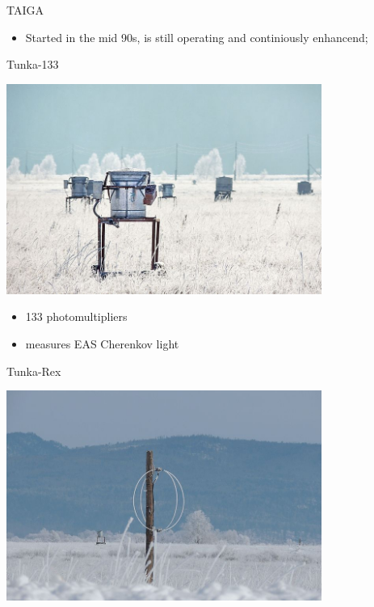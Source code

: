 \begin{frame}{TAIGA}
\footnotesize
\vspace{-1em}
\begin{itemize}
 \item Started in the mid 90s, is still operating and continiously enhancend;
\end{itemize}
\vspace{-2em}
\begin{minipage}[t]{0.31\textwidth}
  \begin{block}{\small Tunka-133}
    \parbox[c][0.20\textheight][t]{1\textwidth}{
      \centering
      \includegraphics[width=0.7742\textwidth]{pics/Tunka-133.jpg}
    }
    \hfill
    \parbox[c][0.15\textheight][t]{1\textwidth}{
      \begin{itemize}
        \setlength{\itemsep}{0pt}
        \item 133 photomultipliers
        \item measures EAS Cherenkov light
      \end{itemize}
    }
  \end{block}
\end{minipage}
\hfill
\begin{minipage}[t]{0.31\textwidth}
  \begin{block}{\small Tunka-Rex}
    \parbox[c][0.20\textheight][t]{1\textwidth}{
      \centering
      \includegraphics[width=0.7742\textwidth]{pics/Tunka-Rex.jpg}
}
\end{block}
\end{minipage}
\end{frame}
